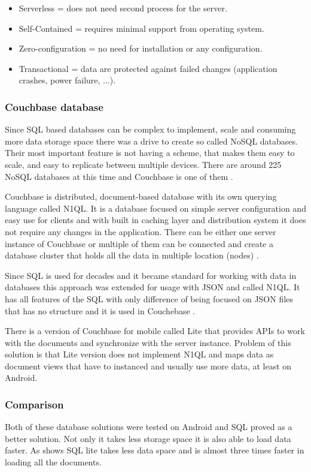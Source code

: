 \begin{itemize}
	\item Serverless = does not need second process for the server.
	\item Self-Contained = requires minimal support from operating system.
	\item Zero-configuration = no need for installation or any configuration.
	\item Transactional = data are protected against failed changes (application crashes, power failure, ...).
\end{itemize}

\subsubsection{Couchbase database}\label{subsec:CouchbaseDatabase}
Since SQL based databases can be complex to implement, scale and consuming more data storage space there was a drive to create so called NoSQL databases. Their most important feature is not having a scheme, that makes them easy to scale, and easy to replicate between multiple devices. There are around 225 NoSQL databases at this time and Couchbase is one of them \cite{NOSQLDB}.

Couchbase is distributed, document-based database with its own querying language called N1QL. It is a database focused on simple server configuration and easy use for clients and with built in caching layer and distribution system it does not require any changes in the application. There can be either one server instance of Couchbase or multiple of them can be connected and create a database cluster that holds all the data in multiple location (nodes) \cite{GSWCBS}.

Since SQL is used for decades and it became standard for working with data in databases this approach was extended for usage with JSON and called N1QL. It has all features of the SQL with only difference of being focused on JSON files that has no structure and it is used in Couchebase \cite{WINQL}.

There is a version of Couchbase for mobile called Lite that provides APIs to work with the documents and synchronize with the server instance. Problem of this solution is that Lite version does not implement N1QL and maps data as document views that have to instanced and usually use more data, at least on Android. 

\subsubsection{Comparison}\label{subsec:Comparison}
Both of these database solutions were tested on Android and SQL proved as a better solution. Not only it takes less storage space it is also able to load data faster. As  shows SQL lite takes less data space and is almost three times faster in loading all the documents.

